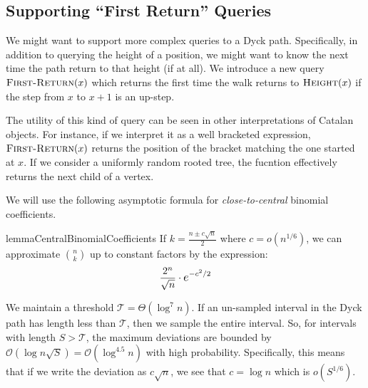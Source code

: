 \subsection{Supporting ``First Return'' Queries}%
\label{sec:supporting_first_return_queries}

We might want to support more complex queries to a Dyck path.
Specifically, in addition to querying the height of a position,
we might want to know the next time the path return to that height (if at all).
We introduce a new query $\textsc{First-Return}(x)$ which returns the first time the walk returns to
$\textsc{Height}(x)$ if the step from $x$ to $x+1$ is an up-step.

The utility of this kind of query can be seen in other interpretations of Catalan objects.
For instance, if we interpret it as a well bracketed expression,
$\textsc{First-Return}(x)$ returns the position of the bracket matching the one started at $x$.
If we consider a uniformly random rooted tree, the fucntion effectively returns the next child of a vertex.

We will use the following asymptotic formula for \emph{close-to-central} binomial coefficients.
\begin{restatable}{lemma}{CentralBinomialCoefficients}
\label{lem:CentralBinomialCoefficients}
If $k = \frac{n \pm c\sqrt n}{2}$ where $c = o(n^{1/6})$,
we can approximate $\binom{n}{k}$ up to constant factors by the expression:
\[
\frac{2^n}{\sqrt n}\cdot \mathlarger e^{-c^2/2}
\]
\end{restatable}

We maintain a threshold $\mathcal T = \Theta(\log^7 n)$.
If an un-sampled interval in the Dyck path has length less than $\mathcal T$, then we sample the entire interval.
So, for intervals with length $S > \mathcal T$,
the maximum deviations are bounded by $\mathcal O(\log n\sqrt S) = \mathcal O(\log^{4.5}n)$ with high probability.
Specifically, this means that if we write the deviation as $c\sqrt n$, we see that $c = \log n$ which is $o(S^{1/6})$.


